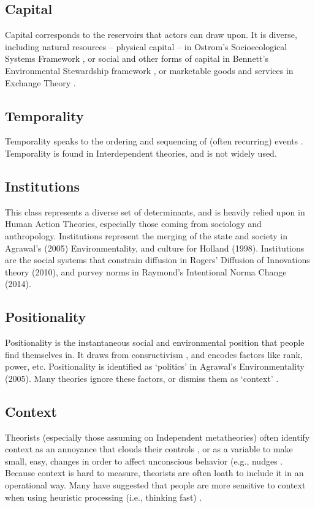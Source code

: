 \documentclass[12 pt]{article}
\begin{document}
		\subsection{Capital}	
		Capital corresponds to the reservoirs that actors can draw upon. It is diverse, including natural resources -- physical capital -- in Ostrom's Socioecological Systems Framework \parencite{Mcginnis2014}, or social and other forms of capital in Bennett's Environmental Stewardship framework \parencite{Bennett2018}, or marketable goods and services in Exchange Theory \parencite{Kotler2000}. 
		\subsection{Temporality}
		Temporality speaks to the ordering and sequencing of (often recurring) events \parencite{Hand2005}. Temporality is found in Interdependent theories, and is not widely used. 
		\subsection{Institutions}
		This class represents a diverse set of determinants, and is heavily relied upon in Human Action Theories, especially those coming from sociology and anthropology. Institutions represent the merging of the state and society in Agrawal's (2005) Environmentality, and culture for Holland (1998). Institutions are the social systems that constrain diffusion in Rogers' Diffusion of Innovations theory (2010), and purvey norms in Raymond's Intentional Norma Change (2014).
		\subsection{Positionality}
		Positionality is the instantaneous social and environmental position that people find themselves in. It draws from consructivism \parencite{Holland1998}, and encodes factors like rank, power, etc. Positionality is identified as `politics' in Agrawal's Environmentality (2005). Many theories ignore these factors, or dismiss them as `context' \parencite{Shove2010}. 
		\subsection{Context}
		 Theorists (especially those assuming on Independent metatheories) often identify context as an annoyance that clouds their controls  \parencite{Ajzen1985,Shove2010}, or as a variable to make small, easy, changes in order to affect unconscious behavior (e.g., nudges \parencite{Thaler2013}. Because context is hard to measure,  theorists are often loath to include it in an operational way. Many have suggested that people are more sensitive to context when using heuristic processing (i.e., thinking fast) \parencite{Chaiken1980,Thaler2008,Kahneman2011}. 
\end{document}
